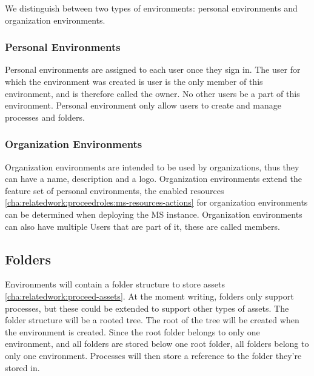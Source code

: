 We distinguish between two types of environments: personal environments and organization
environments.

\subsubsection{Personal Environments}
\label{cha:conceptanddesign:environments:personal}

Personal environments are assigned to each user once they sign in. 
The user for which the environment was created is user is the only member of this
environment, and is therefore called the owner.
No other users be a part of this environment.
Personal environment only allow users to create and manage processes and folders.

\subsubsection{Organization Environments}
\label{cha:conceptanddesign:environments:organization}

Organization environments are intended to be used by organizations, thus they can have a
name, description and a logo.
Organization environments extend the feature set of personal environments, the enabled
resources \ref{cha:relatedwork:proceedroles:ms-resources-actions} for organization
environments can be determined when deploying the MS instance.
Organization environments can also have multiple Users that are part of it, these are
called members.

\subsection{Folders}

Environments will contain a folder structure to store assets
\ref{cha:relatedwork:proceed-assets}.
At the moment writing, folders only support processes, but these could be extended to
support other types of assets.
The folder structure will be a rooted tree.
The root of the tree will be created when the environment is created.
Since the root folder belongs to only one environment, and all folders are stored below
one root folder, all folders belong to only one environment.
Processes will then store a reference to the folder they're stored in.

